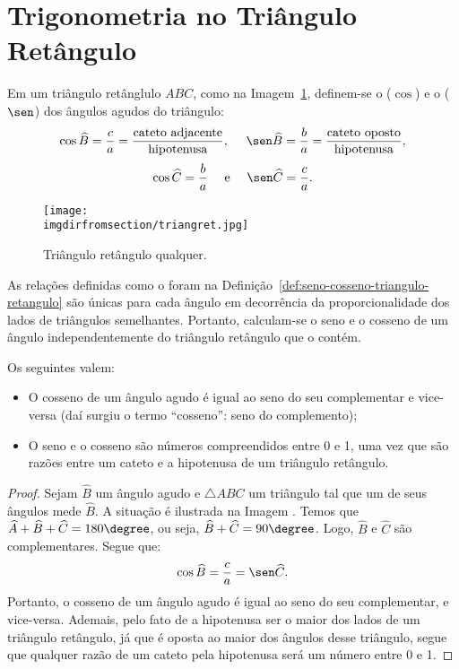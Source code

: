 \section{Trigonometria no Triângulo Retângulo}

\begin{definition}
\label{def:seno-cosseno-triangulo-retangulo}
Em um triângulo retânglulo $ABC$, como na Imagem~\ref{fig:triangulo-retangulo}, definem-se o
 ($\cos$) e o  ($\sen$) dos ângulos agudos do
triângulo:
%
$$\cos \widehat B = \frac c a = \frac {\text{cateto
adjacente}}{\text{hipotenusa}}, \ \ \ \ \sen \widehat B = \frac b a = \frac
{\text{cateto oposto}}{\text{hipotenusa}},$$
$$\cos \widehat C = \frac b a \ \ \ \ \text{e} \ \ \ \ \sen \widehat
C = \frac c a.$$    
%
\begin{figure}[H]
\centering
\texttt{[image: \\imgdirfromsection/triangret.jpg]}
\caption{Triângulo retângulo qualquer.}
\label{fig:triangulo-retangulo}
\end{figure}
\end{definition}

\begin{remark}
As relações definidas como o foram na Definição~\ref{def:seno-cosseno-triangulo-retangulo} são únicas para cada ângulo em
decorrência da proporcionalidade dos lados de triângulos
semelhantes. Portanto, calculam-se o seno e o cosseno de um ângulo
independentemente do triângulo retângulo que o contém.
\end{remark}

\begin{proposition}
Os seguintes valem:
\begin{itemize}
    \item O cosseno de um ângulo agudo é igual ao seno do seu
    complementar e vice-versa (daí surgiu o termo ``cosseno'': seno do complemento);
    \item O seno e o cosseno são números compreendidos entre 0 e 1, uma vez que são razões entre um cateto 
    e a hipotenusa de um triângulo retângulo.
\end{itemize}
\end{proposition}

\begin{proof}
    Sejam $\widehat B$ um ângulo agudo e $\triangle ABC$ um triângulo tal que um de seus ângulos mede $\widehat B$.
    A situação é ilustrada na Imagem . %
    Temos que $\widehat A + \widehat B  + \widehat C = 180\degree$, ou seja, $\widehat B  + \widehat C = 90\degree$.
    Logo, $\widehat B$ e $\widehat C$ são complementares. Segue que:
    $$\cos \widehat B = \frac c a = \sen \widehat C.$$ Portanto, o cosseno de um ângulo agudo é igual ao seno do seu complementar,
    e vice-versa. Ademais, pelo fato de a hipotenusa ser o maior dos lados de um triângulo retângulo, já que é oposta ao 
    maior dos ângulos desse triângulo, segue que qualquer razão de um cateto pela hipotenusa será um número entre 0 e 1.
\end{proof}

